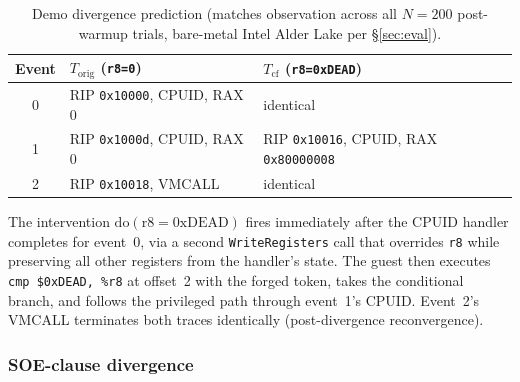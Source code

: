 \documentclass[conference]{IEEEtran}
\newcommand{\Korig}{T_\text{orig}}
\newcommand{\Tcf}{T_\text{cf}}
\begin{document}
\begin{table}[t]
  \caption{Demo divergence prediction (matches observation across
    all $N{=}200$ post-warmup trials, bare-metal Intel Alder Lake
    per \S\ref{sec:eval}).}
  \label{tab:demo-divergence}
  \centering
  \small
  \begin{tabular}{@{}cp{}p{}@{}}
  \toprule
  Event & $\Korig$ (\texttt{r8=0}) & $\Tcf$ (\texttt{r8=0xDEAD}) \\
  \midrule
  0 & RIP \texttt{0x10000}, CPUID, RAX 0    & identical \\
  1 & RIP \texttt{0x1000d}, CPUID, RAX 0    & RIP \texttt{0x10016}, CPUID, RAX \texttt{0x80000008} \\
  2 & RIP \texttt{0x10018}, VMCALL          & identical \\
  \bottomrule
  \end{tabular}
\end{table}

The intervention $\text{do}(\text{r8}{=}\text{0xDEAD})$ fires
immediately after the CPUID handler completes for event~0, via a
second \texttt{WriteRegisters} call that overrides \texttt{r8} while
preserving all other registers from the handler's state. The guest
then executes \texttt{cmp \$0xDEAD, \%r8} at offset~2 with the
forged token, takes the conditional branch, and follows the
privileged path through event~1's CPUID. Event~2's VMCALL terminates
both traces identically (post-divergence reconvergence).

\subsubsection{SOE-clause divergence}
\end{document}
